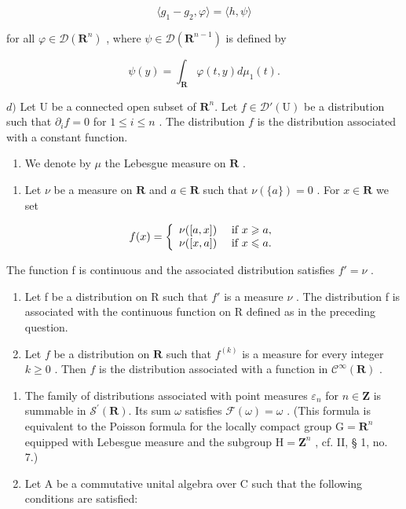 \[
\langle g _ {1} - g _ {2}, \varphi \rangle = \langle h, \psi \rangle
\]

for all \(\varphi\in\mathcal{D}(\mathbf{R}^{n})\) , where \(\psi\in\mathcal{D}(\mathbf{R}^{n-1})\) is defined by

\[
\psi (y) = \int_ {\mathbf {R}} \varphi (t, y) d \mu_ {1} (t).
\]

\(d)\) Let U be a connected open subset of \(\mathbf{R}^{n}\). Let \(f \in \mathcal{D}'(\mathrm{U})\) be a distribution such that \(\partial_{i}f = 0\) for \(1 \leqslant i \leqslant n\) . The distribution \(f\) is the distribution associated with a constant function.

\begin{enumerate}
\def\labelenumi{\arabic{enumi})}
\setcounter{enumi}{3}
\tightlist
\item
  We denote by \(\mu\) the Lebesgue measure on \(\mathbf{R}\) .
\end{enumerate}

\begin{enumerate}
\def\labelenumi{\alph{enumi})}
\tightlist
\item
  Let \(\nu\) be a measure on \(\mathbf{R}\) and \(a \in \mathbf{R}\) such that \(\nu(\{a\}) = 0\) . For \(x \in \mathbf{R}\) we set
\end{enumerate}

\[
f (x) = \left\{ \begin{array}{l l} \nu ([ a, x ]) & \text { if } x \geqslant a, \\ \nu ([ x, a ]) & \text { if } x \leqslant a. \end{array} \right.
\]

The function f is continuous and the associated distribution satisfies \(f' = \nu\) .

\begin{enumerate}
\def\labelenumi{\alph{enumi})}
\setcounter{enumi}{1}
\item
  Let f be a distribution on R such that \(f'\) is a measure \(\nu\) . The distribution f is associated with the continuous function on R defined as in the preceding question.
\item
  Let \(f\) be a distribution on \(\mathbf{R}\) such that \(f^{(k)}\) is a measure for every integer \(k \geqslant 0\) . Then \(f\) is the distribution associated with a function in \(\mathcal{C}^{\infty}(\mathbf{R})\) .
\end{enumerate}

\begin{enumerate}
\def\labelenumi{\arabic{enumi})}
\setcounter{enumi}{4}
\item
  The family of distributions associated with point measures \(\varepsilon_{n}\) for \(n\in\mathbf{Z}\) is summable in \(\mathcal{S}^{\prime}(\mathbf{R})\). Its sum \(\omega\) satisfies \(\mathcal{F}(\omega)=\omega\) . (This formula is equivalent to the Poisson formula for the locally compact group \(\mathrm{G}=\mathbf{R}^{n}\) equipped with Lebesgue measure and the subgroup \(\mathrm{H}=\mathbf{Z}^{n}\) , cf. II, § 1, no. 7.)
\item
  Let A be a commutative unital algebra over C such that the following conditions are satisfied:
\end{enumerate}

